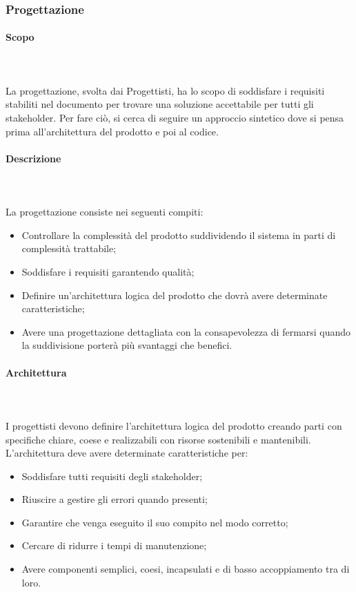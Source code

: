 \subsubsection{Progettazione}
\paragraph{Scopo}\mbox{}\\ \\
La progettazione, svolta dai Progettisti, ha lo scopo di soddisfare i requisiti stabiliti nel documento \AdR{} per trovare una soluzione accettabile per tutti gli stakeholder.
Per fare ciò, si cerca di seguire un approccio sintetico dove si pensa prima all’architettura del prodotto e poi al codice.
\paragraph{Descrizione}\mbox{}\\ \\
La progettazione consiste nei seguenti compiti:
\begin{itemize}
	\item Controllare la complessità del prodotto suddividendo il sistema in parti di complessità trattabile;
	\item Soddisfare i requisiti garantendo qualità;
	\item Definire un’architettura logica del prodotto che dovrà avere determinate caratteristiche;
	\item Avere una progettazione dettagliata con la consapevolezza di fermarsi quando la suddivisione porterà più svantaggi che benefici.
\end{itemize}

\paragraph{Architettura}\mbox{}\\ \\
I progettisti devono definire l’architettura logica del prodotto creando parti con specifiche chiare, coese e realizzabili con risorse sostenibili e mantenibili. L'architettura deve avere determinate caratteristiche per:
\begin{itemize}
	\item Soddisfare tutti requisiti degli stakeholder;
	\item Riuscire a gestire gli errori quando presenti;
	\item Garantire che venga eseguito il suo compito nel modo corretto;
	\item Cercare di ridurre i tempi di manutenzione;
	\item Avere componenti semplici, coesi, incapsulati e di basso accoppiamento tra di loro.
\end{itemize}

